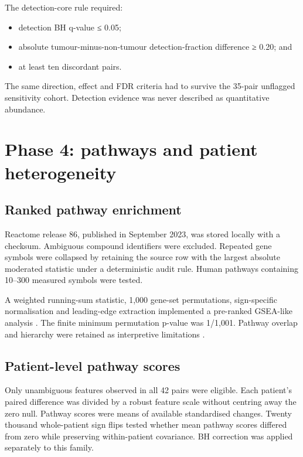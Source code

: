 The detection-core rule required:

\begin{itemize}
\item detection BH q-value ≤ 0.05;
\item absolute tumour-minus-non-tumour detection-fraction difference ≥ 0.20; and
\item at least ten discordant pairs.
\end{itemize}

The same direction, effect and FDR criteria had to survive the 35-pair unflagged sensitivity cohort. Detection evidence was never described as quantitative abundance.

\section{Phase 4: pathways and patient heterogeneity}
\label{sec:phase_4_pathways_and_patient_heterogeneity}

\subsection{Ranked pathway enrichment}

Reactome release 86, published in September 2023, was stored locally with a checksum. Ambiguous compound identifiers were excluded. Repeated gene symbols were collapsed by retaining the source row with the largest absolute moderated statistic under a deterministic audit rule. Human pathways containing 10–300 measured symbols were tested.

A weighted running-sum statistic, 1,000 gene-set permutations, sign-specific normalisation and leading-edge extraction implemented a pre-ranked GSEA-like analysis \parencite{subramanian2005}. The finite minimum permutation p-value was 1/1,001. Pathway overlap and hierarchy were retained as interpretive limitations \parencite{khatri2012}.

\subsection{Patient-level pathway scores}

Only unambiguous features observed in all 42 pairs were eligible. Each patient's paired difference was divided by a robust feature scale without centring away the zero null. Pathway scores were means of available standardised changes. Twenty thousand whole-patient sign flips tested whether mean pathway scores differed from zero while preserving within-patient covariance. BH correction was applied separately to this family.

